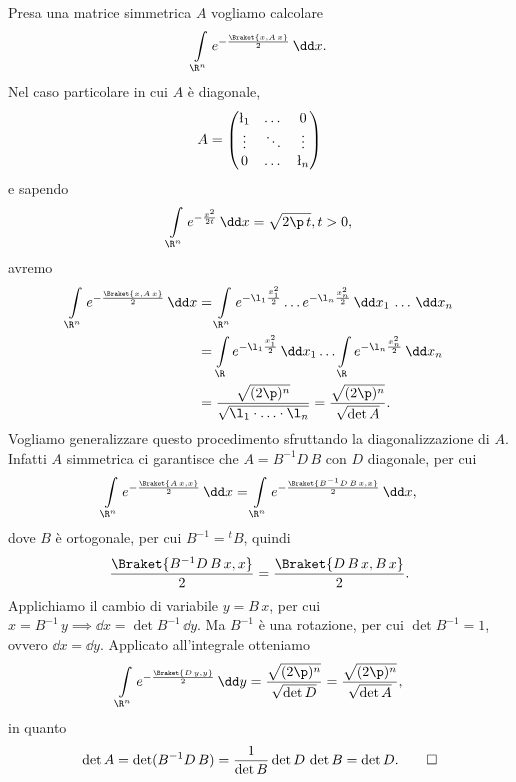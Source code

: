 \begin{ese}
	Presa una matrice simmetrica \(A\) vogliamo calcolare
	\[
		\int\limits_{\R^n}e^{-\frac{\Braket{x,A\,x}}{2}}\,\dd x.
	\]
	Nel caso particolare in cui \(A\) è diagonale,
	\[
		A = 	\begin{pmatrix}
			\l_1   & \dots  & 0      \\
			\vdots & \ddots & \vdots \\
			0      & \dots  & \l_n
		\end{pmatrix}
	\]
	e sapendo
	\[
		\int\limits_{\R^n} e^{-\frac{x^2}{2t}}\,\dd x = \sqrt{2\p\,t},t>0,
	\]
	avremo
	\[
		\begin{split}
			\int\limits_{\R^n}e^{-\frac{\Braket{x,A\,x}}{2}}\,\dd x & = \int\limits_{\R^n}e^{-\l_1 \frac{x_1^2}{2}}\ldots e^{-\l_n \frac{x_n^2}{2}}\,\dd x_1\,\ldots\,\dd x_n\\
			& = \int\limits_\R e^{-\l_1 \frac{x_1^2}{2}}\,\dd x_1 \ldots \int\limits_\R e^{-\l_n \frac{x_n^2}{2}}\,\dd x_n\\
			& = \frac{\sqrt{(2\p)^n}}{\sqrt{\l_1 \cdot\ldots\cdot \l_n}} = \frac{\sqrt{(2\p)^n}}{\sqrt{\det A}}.
		\end{split}
	\]
	Vogliamo generalizzare questo procedimento sfruttando la diagonalizzazione di \(A\).
	Infatti \(A\) simmetrica ci garantisce che \(A=B^{-1}D\,B\) con \(D\) diagonale, per cui
	\[
		\int\limits_{\R^n} e^{- \frac{\Braket{A\,x,x}}{2}}\,\dd x = \int\limits_{\R^n} e^{-\frac{\Braket{B^{-1}D\,B\,x,x}}{2}}\,\dd x,
	\]
	dove \(B\) è ortogonale, per cui \(B^{-1}={}^{t}B\), quindi
	\[
		\frac{\Braket{B^{-1} D\,B\,x,x}}{2} = \frac{\Braket{D\,B\,x,B\,x}}{2}.
	\]
	Applichiamo il cambio di variabile \(y=B\,x\), per cui \(x=B^{-1}\,y \implies \dd x = \det B^{-1}\,\dd y\).
	Ma \(B^{-1}\) è una rotazione, per cui \(\det B^{-1} = 1\), ovvero \(\dd x = \dd y\).
	Applicato all'integrale otteniamo
	\[
		\int\limits_{\R^n} e^{-\frac{\Braket{D\,y,y}}{2}}\,\dd y = \frac{\sqrt{(2\p)^n}}{\sqrt{\det D}} = \frac{\sqrt{(2\p)^n}}{\sqrt{\det A}},
	\]
	in quanto
	\[
		\det A = \det(B^{-1}D\,B) = \frac{1}{\det B}\det D\,\det B = \det D.\qedhere
	\]
\end{ese}